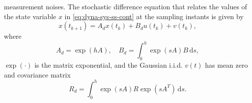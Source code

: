 \documentclass[letterpaper,10pt,journal,final]{IEEEtran}
\theoremstyle{definition}
\theoremstyle{remark}
\begin{document}
measurement noises.  The stochastic difference equation that relates the values of
the state variable $x$ in \eqref{eq:dyna-sys-ss-cont} at the sampling
instants\cite[p.~82-85]{Astrom2012}\cite[chap.~2]{Garnier2008} is given by
\begin{equation}
  \label{eq:dyna-sys-ss-discr}
    x(t_{k+1}) = A_dx(t_k) + B_d u(t_k) + v(t_k),
\end{equation}
where
\begin{equation}
  \label{eq:formula-Ad-Bd}
  A_d = \exp({hA}), \quad
  B_d = \int_0^h \exp(sA)B \,\mathrm{d}s,
\end{equation}
$\exp(\cdot)$ is the matrix exponential, and the Gaussian i.i.d. $v(t)$ has mean zero
and covariance matrix
\begin{equation}
  \label{eq:disc-time-sys-wn-cov}
  R_{d} = \int_{0}^h \exp({sA}) R \exp({sA^T}) \,\mathrm{d}s.
\end{equation}
\end{document}
